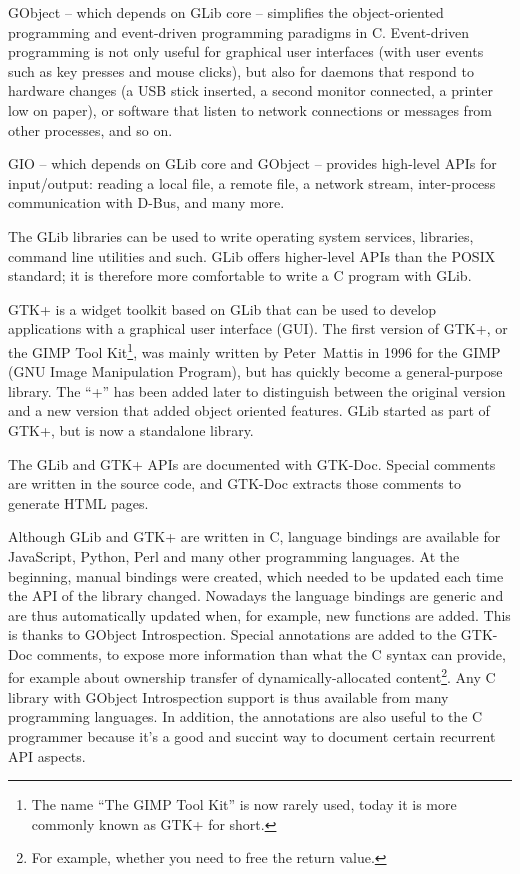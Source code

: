 GObject -- which depends on GLib core -- simplifies the object-oriented programming and event-driven programming paradigms in C. Event-driven programming is not only useful for graphical user interfaces (with user events such as key presses and mouse clicks), but also for daemons that respond to hardware changes (a USB stick inserted, a second monitor connected, a printer low on paper), or software that listen to network connections or messages from other processes, and so on.

GIO -- which depends on GLib core and GObject -- provides high-level APIs for input/output: reading a local file, a remote file, a network stream, inter-process communication with D-Bus, and many more.

The GLib libraries can be used to write operating system services, libraries, command line utilities and such. GLib offers higher-level APIs than the POSIX standard; it is therefore more comfortable to write a C program with GLib.

GTK+ is a widget toolkit based on GLib that can be used to develop applications with a graphical user interface (GUI). The first version of GTK+, or the GIMP Tool Kit\footnote{The name ``The GIMP Tool Kit'' is now rarely used, today it is more commonly known as GTK+ for short.}, was mainly written by Peter~Mattis in 1996 for the GIMP (GNU Image Manipulation Program), but has quickly become a general-purpose library. The ``+'' has been added later to distinguish between the original version and a new version that added object oriented features. GLib started as part of GTK+, but is now a standalone library.

The GLib and GTK+ APIs are documented with GTK-Doc. Special comments are written in the source code, and GTK-Doc extracts those comments to generate HTML pages.

Although GLib and GTK+ are written in C, language bindings are available for JavaScript, Python, Perl and many other programming languages. At the beginning, manual bindings were created, which needed to be updated each time the API of the library changed. Nowadays the language bindings are generic and are thus automatically updated when, for example, new functions are added. This is thanks to GObject Introspection. Special annotations are added to the GTK-Doc comments, to expose more information than what the C syntax can provide, for example about ownership transfer of dynamically-allocated content\footnote{For example, whether you need to free the return value.}. Any C library with GObject Introspection support is thus available from many programming languages. In addition, the annotations are also useful to the C programmer because it's a good and succint way to document certain recurrent API aspects.

